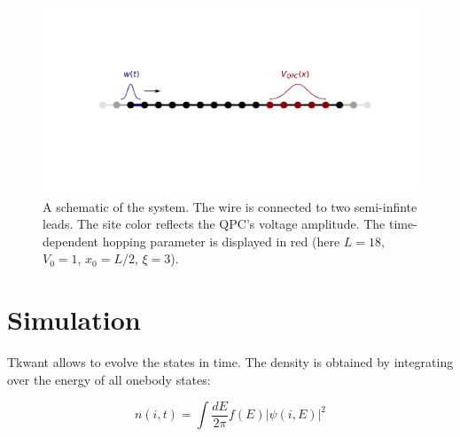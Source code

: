 \documentclass[aps,prl,preprint,groupedaddress]{revtex4-1}
\begin{document}
\begin{figure}[h]
	\centering
	\includegraphics[trim=0cm 5cm 0cm 5cm, width = 0.9\linewidth]{../figures/scheme_system/scheme_system}
	\caption{A schematic of the system. The wire is connected to two semi-infinte leads. The site color reflects the QPC's voltage amplitude. The time-dependent hopping parameter is displayed in red (here $L = 18$, $V_0 = 1$, $x_0 = L/2$, $\xi = 3$).}
	\label{fig:systcolor}
\end{figure}
\section{Simulation}
%
 Tkwant allows to evolve the states in time. The density is obtained by integrating over the energy of all onebody states:
 
 \begin{equation}
 n(i,t) = \int \frac{dE}{2\pi} f(E) |\psi(i,E)|^2
 \end{equation}
 
\end{document}
